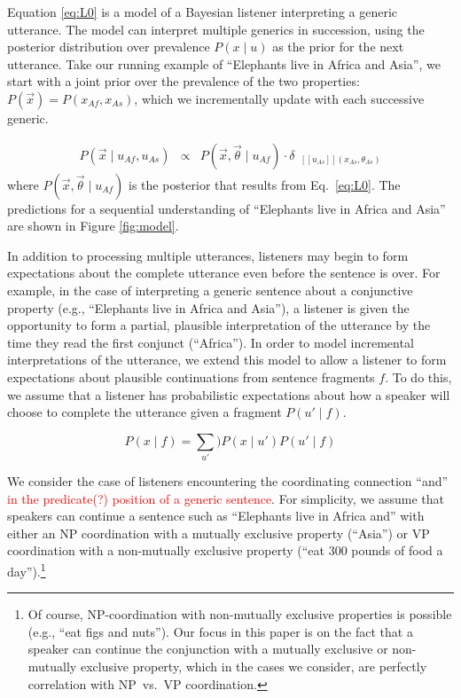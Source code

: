 \documentclass[10pt,letterpaper]{article}
\newcommand{\denote}[1]{\mbox{ $[\![ #1 ]\!]$}}
\newcommand{\red}[1]{{\textcolor{Red}{#1}}}
\begin{document}
Equation \ref{eq:L0} is a model of a Bayesian listener interpreting a generic utterance.
The model can interpret multiple generics in succession, using the posterior distribution over prevalence $P(x \mid u)$ as the prior for the next utterance. 
Take our running example of ``Elephants live in Africa and Asia'', we start with a joint prior over the prevalence of the two properties: $P(\vec{x}) = P(x_{Af}, x_{As})$, which we incrementally update with each successive generic. 

\begin{eqnarray}
P(\vec{x} \mid u_{Af}, u_{As})& \propto & P(\vec{x}, \vec{\theta} \mid u_{Af})  \cdot \delta_{\denote{u_{As}}(x_{As}, \theta_{As})} %
\label{eq:L0a}
\end{eqnarray}
\noindent where $P(\vec{x}, \vec{\theta} \mid u_{Af})$  is the posterior that results from Eq.~\ref{eq:L0}.
The predictions for a sequential understanding of ``Elephants live in Africa and Asia'' are shown in Figure \ref{fig:model}.

In addition to processing multiple utterances, listeners may begin to form expectations about the complete utterance even before the sentence is over. 
For example, in the case of interpreting a generic sentence about a conjunctive property (e.g., ``Elephants live in Africa and Asia''), a listener is given the opportunity to form a partial, plausible interpretation of the utterance by the time they read the first conjunct (``Africa''). 
In order to model incremental interpretations of the utterance, we extend this model to allow a listener to form expectations about plausible continuations from sentence fragments $f$.
To do this, we assume that a listener has probabilistic expectations about how a speaker will choose to complete the utterance given a fragment $P(u' \mid f)$.

\begin{equation}
P(x \mid f) = \sum_{u'}) P(x \mid u') P(u' \mid f) 
\label{eq:L0a}
\end{equation}

We consider the case of listeners encountering the coordinating connection ``and'' \red{in the predicate(?) position of a generic sentence}. 
For simplicity, we assume that speakers can continue a sentence such as ``Elephants live in Africa and'' with either an NP coordination with a mutually exclusive property (``Asia'') or VP coordination with a non-mutually exclusive property (``eat 300 pounds of food a day'').\footnote{
	Of course, NP-coordination with non-mutually exclusive properties is possible (e.g., ``eat figs and nuts''). 
	Our focus in this paper is on the fact that a speaker can continue the conjunction with a mutually exclusive or non-mutually exclusive property, which in the cases we consider, are perfectly correlation with NP~vs.~VP coordination.
}
\end{document}
